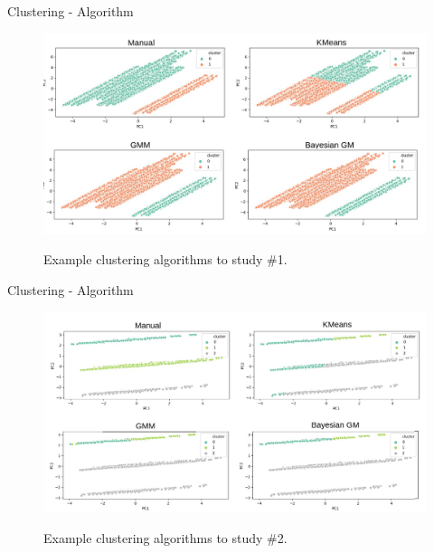 
\begin{frame}{Clustering - Algorithm}
    \begin{figure}
        \centering
        \includegraphics[width=\linewidth]{fig/ch3-cluster-algo-ex1.png}
        \label{fig:cluster-algo-ex1}
        \caption{Example clustering algorithms to study \#1.} 
    \end{figure}
\end{frame}


\begin{frame}{Clustering - Algorithm}
    \begin{figure}
        \centering
        \includegraphics[width=\linewidth]{fig/ch3-cluster-algo-ex2.png}
        \label{fig:cluster-algo-ex2}
        \caption{Example clustering algorithms to study \#2.} 
    \end{figure}
\end{frame}


